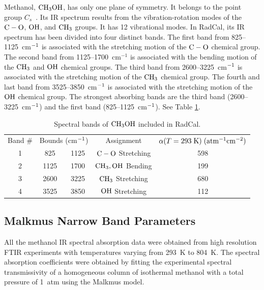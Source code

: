 Methanol, $\rm CH_3OH$, has only one plane of symmetry. It belongs to the point group $C_{s}$~\cite{Herzberg1949}. Its IR spectrum results from the vibration-rotation modes of the $\rm C-O$, $\rm OH$, and $\rm CH_3$ groups. It has 12 vibrational modes. In RadCal, its IR spectrum has been divided into four distinct bands. The first band from 825--1125~cm$\rm^{-1}$ is associated with the stretching motion of the $\rm C-O$ chemical group. The second band from 1125--1700~cm$^{-1}$ is associated with the bending motion of the $\rm CH_3$ and $\rm OH$ chemical groups. The third band from 2600--3225~cm$\rm^{-1}$ is associated with the stretching motion of the $\rm CH_3$ chemical group. The fourth and last band from 3525--3850~cm$\rm^{-1}$ is associated with the stretching motion of the $\rm OH$ chemical group. The strongest absorbing bands are the third band (2600--3225~cm$\rm^{-1}$) and the first band (825--1125~cm$\rm^{-1}$). See Table \ref{Table::CH3OH}.
\begin{table}[ht]
   \centering
   \caption{Spectral bands of $\rm CH_3OH$ included in RadCal.}
   \vspace{0.1in}
   \label{Table::CH3OH}
   \begin{tabular}{|c|c|c|c|c|}
    \hline
    Band \# & \multicolumn{2}{|l|}{Bounds (cm$\rm ^{-1}$) } & Assignment &  $\alpha(T=293 \; {\rm K}) \; (\rm {atm^{-1} cm^{-2}})$ \\
    \cline{1-5}
    1 & 825  & 1125 & $\rm C-O$ Stretching   & 598 \\
    2 & 1125 & 1700 & $\rm CH_3, OH$ Bending & 199 \\
    3 & 2600 & 3225 & $\rm CH_3$ Stretching  & 680 \\
    4 & 3525 & 3850 & $\rm OH$ Stretching    & 112 \\
    \hline
   \end{tabular}
\end{table}

\subsection{Malkmus Narrow Band Parameters}

All the methanol IR spectral absorption data were obtained from high resolution FTIR experiments with temperatures varying from 293~K to 804~K. The spectral absorption coefficients were obtained by fitting the experimental spectral transmissivity of a homogeneous column of isothermal methanol with a total pressure of 1~atm using the Malkmus model.


